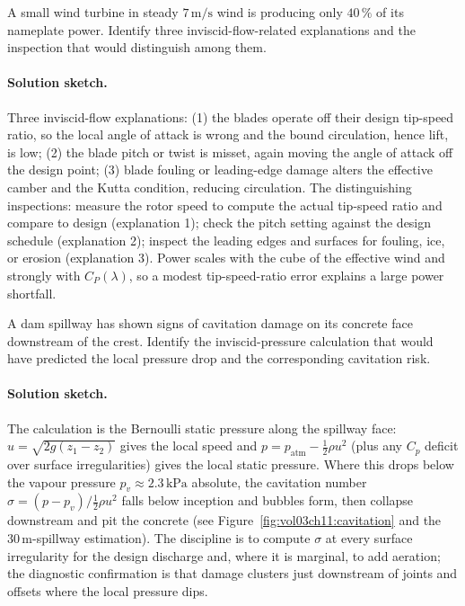 \begin{exercise}
A small wind turbine in steady $7\,\si{\meter\per\second}$ wind is
producing only $40\,\%$ of its nameplate power. Identify three
inviscid-flow-related explanations and the inspection that would
distinguish among them.

\paragraph{Solution sketch.} Three inviscid-flow explanations: (1) the
blades operate off their design tip-speed ratio, so the local angle of
attack is wrong and the bound circulation, hence lift, is low; (2) the
blade pitch or twist is misset, again moving the angle of attack off
the design point; (3) blade fouling or leading-edge damage alters the
effective camber and the Kutta condition, reducing circulation. The
distinguishing inspections: measure the rotor speed to compute the
actual tip-speed ratio and compare to design (explanation 1); check
the pitch setting against the design schedule (explanation 2); inspect
the leading edges and surfaces for fouling, ice, or erosion
(explanation 3). Power scales with the cube of the effective wind and
strongly with $C_P(\lambda)$, so a modest tip-speed-ratio error
explains a large power shortfall.
\end{exercise}

\begin{exercise}
A dam spillway has shown signs of cavitation damage on its concrete
face downstream of the crest. Identify the inviscid-pressure
calculation that would have predicted the local pressure drop and
the corresponding cavitation risk.

\paragraph{Solution sketch.} The calculation is the Bernoulli static
pressure along the spillway face: $u = \sqrt{2g(z_1 - z_2)}$ gives the
local speed and $p = p_\text{atm} - \tfrac12\rho u^2$ (plus any
$C_p$ deficit over surface irregularities) gives the local static
pressure. Where this drops below the vapour pressure $p_v \approx
2.3\,\text{kPa}$ absolute, the cavitation number $\sigma = (p -
p_v)/\tfrac12\rho u^2$ falls below inception and bubbles form, then
collapse downstream and pit the concrete (see
Figure~\ref{fig:vol03ch11:cavitation} and the
$30\,\si{\meter}$-spillway estimation). The discipline is to compute
$\sigma$ at every surface irregularity for the design discharge and,
where it is marginal, to add aeration; the diagnostic confirmation is
that damage clusters just downstream of joints and offsets where the
local pressure dips.
\end{exercise}

